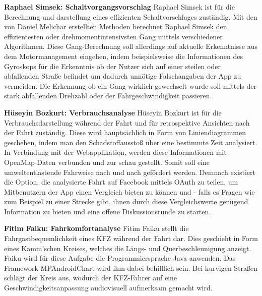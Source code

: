 	\textbf{Raphael Simsek: Schaltvorgangsvorschlag\newline}
	Raphael Simsek ist für die Berechnung und darstellung eines effizienten Schaltvorschlages zuständig.
	Mit den von Daniel Melichar erstellten Methoden berechnet Raphael Simsek den effizientesten oder drehmomentintensivsten Gang mittels verschiedener Algorithmen. Diese Gang-Berechnung soll allerdings auf aktuelle Erkenntnisse aus dem Motormanagement eingehen, indem beispielsweise die Informationen des Gyroskops für die Erkenntnis ob der Nutzer sich auf einer steilen oder abfallenden Straße befindet um dadurch unnötige Falschangaben der App zu vermeiden. Die Erkennung ob ein Gang wirklich gewechselt wurde soll mittels der stark abfallenden Drehzahl oder der Fahrgeschwindigkeit passieren.
	
	\textbf{Hüseyin Bozkurt: Verbrauchsanalyse\newline}
	 Hüseyin Bozkurt ist für die Verbrauchsdarstellung während der Fahrt und für retrospektive Ansichten nach der Fahrt zuständig.
	 Diese wird hauptsächlich in Form von Liniendiagrammen geschehen, indem man den Schadstoffausstoß über eine bestimmte Zeit analysiert. In Verbindung mit der Webapplikation, werden diese Informationen mit OpenMap-Daten verbunden und zur schau gestellt.
	 Somit soll eine umweltentlastende Fahrweise nach und nach gefördert werden. Demnach existiert die Option, die analysierte Fahrt auf Facebook mittels OAuth zu teilen, um Mitbenutzern der App einen Vergleich bieten zu können und - falls es Fragen wie zum Beispiel zu einer Strecke gibt, ihnen durch diese Vergleichswerte genügend Information zu bieten und eine offene Diskussionsrunde zu starten.
	
	\textbf{Fitim Faiku: Fahrkomfortanalyse\newline}
	 Fitim Faiku stellt die Fahrgastbequemlichkeit eines KFZ während der Fahrt dar.
	 Dies geschieht in Form eines Kamm'schen Kreises, welches die Längs- und Querbeschleunigung anzeigt. Faiku wird für diese Aufgabe die Programmiersprache Java anwenden.
	 Das Framework MPAndroidChart wird ihm dabei behilflich sein. Bei kurvigen Straßen schlägt der Kreis aus, wodurch der KFZ-Fahrer auf eine Geschwindigkeitsanpassung audiovisuell aufmerksam gemacht wird.
